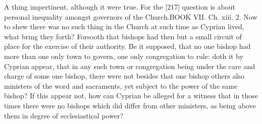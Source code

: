 A thing impertinent, although it were true. For the [217] question is about personal inequality amongst governors of the Church.BOOK VII. Ch. xiii. 2. Now to shew there was no such thing in the Church at such time as Cyprian lived, what bring they forth? Forsooth that bishops had then but a small circuit of place for the exercise of their authority. Be it supposed, that no one bishop had more than one only town to govern, one only congregation to rule: doth it by Cyprian appear, that in any such town or congregation being under the care and charge of some one bishop, there were not besides that one bishop others also ministers of the word and sacraments, yet subject to the power of the same bishop? If this appear not, how can Cyprian be alleged for a witness that in those times there were no bishops which did differ from other ministers, as being above them in degree of ecclesiastical power?

